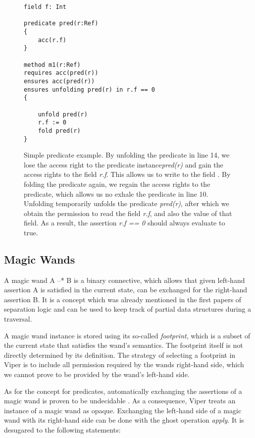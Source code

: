 \documentclass[12pt]{article}
\begin{document}
\begin{figure}[h]
  \centering
\begin{lstlisting}
field f: Int

predicate pred(r:Ref)
{
    acc(r.f)
}

method m1(r:Ref)
requires acc(pred(r))
ensures acc(pred(r))
ensures unfolding pred(r) in r.f == 0
{

    unfold pred(r)
    r.f := 0
    fold pred(r)
}
\end{lstlisting}
\caption[predicate example]
   {Simple predicate example. By unfolding the predicate in line 14, we lose the access right to the predicate instance\textit{pred(r)} and gain the access rights to the field \textit{r.f}. This allows us to write to the field . By folding the predicate again, we regain the access rights to the predicate, which allows us no exhale the predicate in line 10. Unfolding temporarily unfolds the predicate \textit{pred(r)}, after which we obtain the permission to read the field \textit{r.f}, and also the value of that field. As a result, the assertion \textit{r.f == 0} should always evaluate to true.}
\label{predicateExample}
\end{figure}

\subsection{Magic Wands}
A magic wand A --* B is a binary connective, which allows that given left-hand assertion A is satisfied in the current state, can be exchanged for the right-hand assertion B. It is a concept which was already mentioned in the first papers of separation logic\cite{reynolds2002separation} and can be used to keep track of partial data structures during a traversal.

A magic wand instance is stored using its so-called \textit{footprint}, which is a subset of the current state that satisfies the wand's semantics. The footprint itself is not directly determined by its definition. The strategy of selecting a footprint in Viper is to include all permission required by the wands right-hand side, which we cannot prove to be provided by the wand's left-hand side\cite{magicwand}.

As for the concept for predicates, automatically exchanging the assertions of a magic wand is proven to be undecidable \cite{brochenin2008almighty}. As a consequence, Viper treats an instance of a magic wand as opaque. Exchanging the left-hand side of a magic wand with its right-hand side can be done with the ghost operation \textit{apply}. It is desugared to the following statements:
\end{document}
